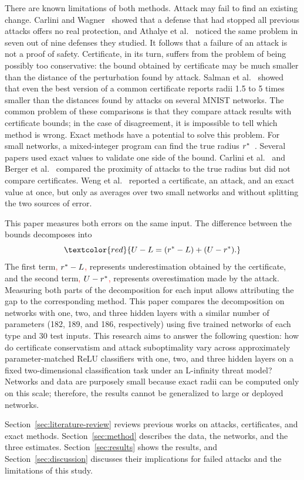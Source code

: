 There are known limitations of both methods. Attack may fail to find an existing change. Carlini and
Wagner~\cite{MapSource03} showed that a defense that had stopped all previous attacks offers no real
protection, and Athalye et al.~\cite{MapSource06} noticed the same problem in seven out of nine
defenses they studied. It follows that a failure of an attack is not a proof of safety. Certificate,
in its turn, suffers from the problem of being possibly too conservative: the bound obtained by
certificate may be much smaller than the distance of the perturbation found by attack. Salman et
al.~\cite{MapSource10} showed that even the best version of a common certificate reports radii 1.5
to 5 times smaller than the distances found by attacks on several MNIST networks. The common problem
of these comparisons is that they compare attack results with certificate bounds; in the case of
disagreement, it is impossible to tell which method is wrong. Exact methods have a potential to
solve this problem. For small networks, a mixed-integer program can find the true radius
$r^{*}$~\cite{MapSource12}. Several papers used exact values to validate one side of the bound.
Carlini et al.~\cite{Carlini2017Provable} and Berger et al.~\cite{Berger2026Upper} compared the
proximity of attacks to the true radius but did not compare certificates. Weng et
al.~\cite{Weng2018FastLin} reported a certificate, an attack, and an exact value at once, but only
as averages over two small networks and without splitting the two sources of error.

This paper measures both errors on the same input. The difference between the bounds decomposes into
\[
  \textcolor{red}{U - L = (\rstar - L) + (U - \rstar).}
\]
The first term\textcolor{red}{, $r^{*} - L$,} represents underestimation obtained by the certificate,
and the second term\textcolor{red}{, $U - r^{*}$,} represents overestimation made by the attack.
Measuring both parts
of the decomposition for each input allows attributing the gap to the corresponding method. This
paper compares the decomposition on networks with one, two, and three hidden layers with a similar
number of parameters (182, 189, and 186, respectively) using five trained networks of each type and
30 test inputs. This research aims to answer the following question: how do certificate conservatism
and attack suboptimality vary across approximately parameter-matched ReLU classifiers with one, two,
and three hidden layers on a fixed two-dimensional classification task under an L-infinity threat
model? Networks and data are purposely small because exact radii can be computed only on this scale;
therefore, the results cannot be generalized to large or deployed networks.

Section~\ref{sec:literature-review} reviews previous works on attacks, certificates, and exact
methods. Section~\ref{sec:method} describes the data, the networks, and the three estimates.
Section~\ref{sec:results} shows the results, and Section~\ref{sec:discussion} discusses their
implications for failed attacks and the limitations of this study.
